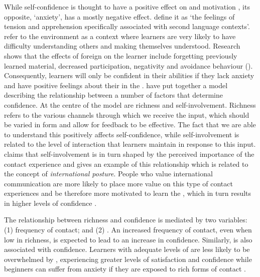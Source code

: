 \documentclass[output=paper]{langsci/langscibook}
\begin{document}
While  self-confidence is thought to have a positive effect on  and motivation \citep{Dörnyei2005}, its opposite,  ‘anxiety’, has a mostly negative effect. \citet[284]{MacIntyreEtAl1994} define it as ‘the feelings of tension and apprehension specifically associated with second language contexts’. \citet{HorwitzEtAl1986} refer to the  environment as a context where learners are very likely to have difficulty understanding others and making themselves understood. Research shows that the effects of foreign  on the learner include forgetting previously learned material, decreased participation, negativity and avoidance behaviour (\citealt{GregersenHorwitz2002}). Consequently, learners will only be confident in their  abilities if they lack anxiety and have positive feelings about their  in the . \citet{SampasivamClément2014} have put together a model describing the relationship between a number of factors that determine  confidence. At the centre of the model are richness and self-involvement. Richness refers to the various channels through which we receive the  input, which should be varied in form and allow for feedback to be effective. The fact that we are able to understand this  positively affects self-confidence, while self-involvement is related to the level of interaction that learners maintain in response to this input. \citet{Yashima2002} claims that self-involvement is in turn shaped by the perceived importance of the contact experience and gives an example of this relationship which is related to the concept of \textit{international posture}. People who value international communication are more likely to place more value on this type of contact experiences and be therefore more motivated to learn the , which in turn results in higher levels of  confidence \citep{Yashima2009}. 



The relationship between richness and  confidence is mediated by two variables: (1) frequency of contact; and (2) .  An increased frequency of contact, even when low in richness, is expected to lead to an increase in  confidence. Similarly,  is also associated with  confidence.  Learners with adequate levels of  are less likely to be overwhelmed by , experiencing greater levels of satisfaction and confidence while beginners can suffer  from anxiety if they are exposed to rich forms of contact \cite{OzdenerSatar2008}.
\end{document}
